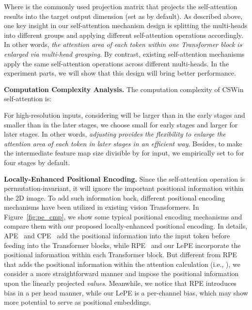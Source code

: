 \documentclass[10pt,twocolumn,letterpaper]{article}
\newcommand{\Fref}[1]{Figure~\ref{#1}}
\begin{document}
Where  is the commonly used projection matrix that projects the self-attention results into the target output dimension (set as  by default). As described above, one key insight in our self-attention mechanism design is splitting the multi-heads into different groups and applying different self-attention operations accordingly. In other words, \emph{the attention area of each token within one Transformer block is enlarged via multi-head grouping}. By contrast, existing self-attention mechanisms apply the same self-attention operations across different multi-heads. In the experiment parts, we will show that this design will bring better performance. 


\noindent \textbf{Computation Complexity Analysis.} The computation complexity of CSWin self-attention is:


For high-resolution inputs, considering  will be larger than  in the early stages and smaller than  in the later stages, we choose small  for early stages and larger  for later stages. In other words,  \emph{adjusting  provides the flexibility to enlarge the attention area of each token in later stages in an efficient way}. Besides, to make the intermediate feature map size divisible by  for  input, we empirically set  to  for four stages by default.





\noindent \textbf{Locally-Enhanced Positional Encoding.} Since the self-attention operation is permutation-invariant, it will ignore the important positional information within the 2D image. To add such information back, different positional encoding mechanisms have been utilized in existing vision Transformers. In \Fref{fig:pe_cmp}, we show some typical positional encoding mechanisms and compare them with our proposed locally-enhanced positional encoding. In details, APE~\cite{vaswani2017attention} and CPE~\cite{chu2021conditional} add the positional information into the input token before feeding into the Transformer blocks, while RPE~\cite{shaw2018self} and our LePE incorporate the positional information within each Transformer block. But different from RPE that adds the positional information within the attention calculation (i.e., ), we consider a more straightforward manner and impose the positional information upon the linearly projected \emph{values}. Meanwhile, we notice that RPE introduces bias in a per head manner, while our LePE is a per-channel bias, which may show more potential to serve as positional embeddings.
\end{document}
